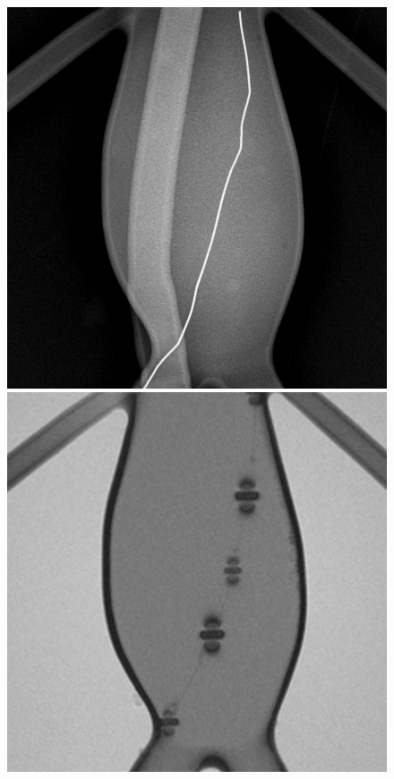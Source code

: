 \documentclass[conference]{IEEEtran}
\begin{document}
\begin{figure}[h]
    \centering
    \begin{minipage}{0.241\textwidth}
        \centering
        \includegraphics[width=\textwidth]{Conference/img/xray-device-visibility.png}
    \end{minipage}\hfill \hspace*{0cm}
    \begin{minipage}{0.241\textwidth}
        \centering
        \includegraphics[width=\textwidth]{Conference/img/mri-device-visibility.jpg}

\end{minipage}
\end{figure}
\end{document}

